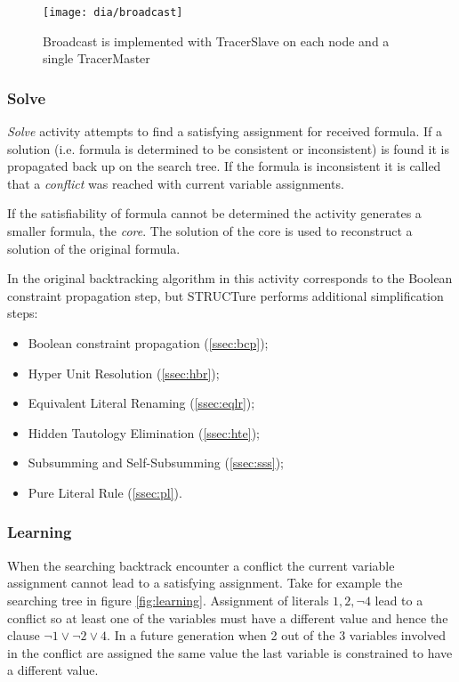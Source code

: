\begin{figure}[h]
  \centering
  \texttt{[image: dia/broadcast]}
  \caption{Broadcast is implemented with
  TracerSlave on each node and a single TracerMaster}
  \label{fig:broadcast}
\end{figure}


\subsubsection{Solve}
\label{sssec:solve}

\emph{Solve} activity attempts to find a satisfying assignment for
received formula. If a solution (i.e.  formula is determined to be
consistent or inconsistent) is found it is propagated back up on
the search tree. If the formula is inconsistent it is called that
a \emph{conflict} was reached with current variable assignments.

If the satisfiability of formula cannot be determined the activity
generates a smaller formula, the \emph{core}. The solution of the
core is used to reconstruct a solution of the original
formula.

In the original backtracking algorithm in
\cite{Davis:1960:CPQ:321033.321034} this activity corresponds to
the Boolean constraint propagation step, but STRUCTure performs
additional simplification steps:
\begin{itemize}
  \item Boolean constraint propagation (\ref{ssec:bcp});
  \item Hyper Unit Resolution (\ref{ssec:hbr});
  \item Equivalent Literal Renaming (\ref{ssec:eqlr});
  \item Hidden Tautology Elimination (\ref{ssec:hte});
  \item Subsumming and Self-Subsumming (\ref{ssec:sss});
  \item Pure Literal Rule (\ref{ssec:pl}).
\end{itemize}


\subsubsection{Learning}
\label{sssec:learning}

When the searching backtrack encounter a conflict the current
variable assignment cannot lead to a satisfying assignment.
Take for example the searching tree in figure \ref{fig:learning}.
Assignment of literals $1, 2, \neg 4$ lead to a conflict so at
least one of the variables must have a different value and hence the
clause $\neg 1 \lor \neg 2 \lor 4$.  In a future generation when 2
out of the 3 variables involved in the conflict are assigned the same
value the last variable is constrained to have a different value.

